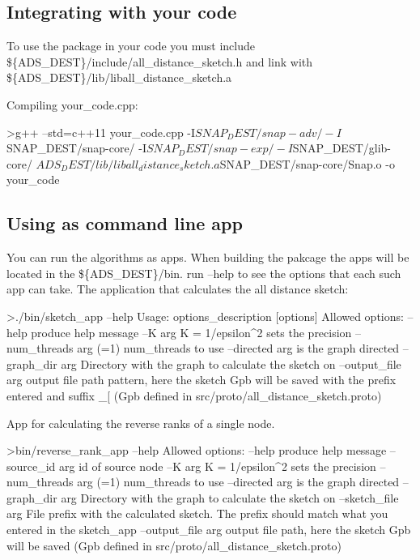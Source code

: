 \subsection*{Integrating with your code}

To use the package in your code you must include \$\{A\+D\+S\+\_\+\+D\+E\+S\+T\}/include/all\+\_\+distance\+\_\+sketch.h and link with \$\{A\+D\+S\+\_\+\+D\+E\+S\+T\}/lib/liball\+\_\+distance\+\_\+sketch.a

Compiling your\+\_\+code.\+cpp\+:

\begin{DoxyVerb}>g++ --std=c++11  your_code.cpp -I${SNAP_DEST}/snap-adv/ -I${SNAP_DEST}/snap-core/ -I${SNAP_DEST}/snap-exp/ -I${SNAP_DEST}/glib-core/  ${ADS_DEST}/lib/liball_distance_sketch.a ${SNAP_DEST}/snap-core/Snap.o  -o your_code
\end{DoxyVerb}


\subsection*{Using as command line app}

You can run the algorithms as apps. When building the pakcage the apps will be located in the \$\{A\+D\+S\+\_\+\+D\+E\+S\+T\}/bin. run --help to see the options that each such app can take. The application that calculates the all distance sketch\+: \begin{DoxyVerb}>./bin/sketch_app --help
Usage: options_description [options]
Allowed options:
  --help                 produce help message
  --K arg                K = 1/epsilon^2 sets the precision
  --num_threads arg (=1) num_threads to use
  --directed arg         is the graph directed
  --graph_dir arg        Directory with the graph to calculate the sketch on
  --output_file arg      output file path pattern, here the sketch Gpb will be saved with the 
                         prefix entered and suffix _[%
                         (Gpb defined in src/proto/all_distance_sketch.proto)
\end{DoxyVerb}


App for calculating the reverse ranks of a single node. \begin{DoxyVerb}>bin/reverse_rank_app --help
    Allowed options:
  --help                 produce help message
  --source_id arg        id of source node
  --K arg                K = 1/epsilon^2 sets the precision
  --num_threads arg (=1) num_threads to use
  --directed arg         is the graph directed
  --graph_dir arg        Directory with the graph to calculate the sketch on
  --sketch_file arg      File prefix with the calculated sketch. The prefix should match what you entered in the sketch_app 
  --output_file arg      output file path, here the sketch Gpb will be saved 
                         (Gpb defined in src/proto/all_distance_sketch.proto)
\end{DoxyVerb}


